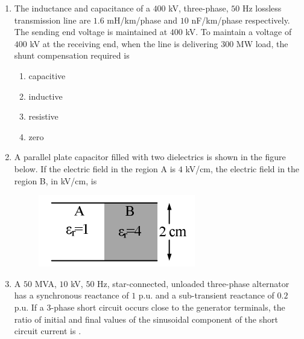 \documentclass[journal,12pt,onecolumn]{IEEEtran}
\theoremstyle{remark}
\begin{document}
\begin{enumerate}[start=1, label=Q.\arabic*]
    \hfill{}

    \item The inductance and capacitance of a $400$ kV, three-phase, $50$ Hz lossless transmission line are $1.6$ mH/km/phase and $10$ nF/km/phase respectively. The sending end voltage is maintained at $400$ kV. To maintain a voltage of $400$ kV at the receiving end, when the line is delivering $300$ MW load, the shunt compensation required is
    \begin{enumerate}
        \item capacitive
        \item inductive
        \item resistive
        \item zero
    \end{enumerate}

    \hfill{}

    \item A parallel plate capacitor filled with two dielectrics is shown in the figure below. If the electric field in the region A is $4$ kV/cm, the electric field in the region B, in kV/cm, is
    \begin{figure}[H]
        \includegraphics[width=0.4\columnwidth]{Figures/2q16.png}
        \centering
        \caption{}
    \end{figure}
    \begin{enumerate}
    \end{enumerate}

    \hfill{}

    \item A $50$ MVA, $10$ kV, $50$ Hz, star-connected, unloaded three-phase alternator has a synchronous reactance of $1$ p.u. and a sub-transient reactance of $0.2$ p.u. If a 3-phase short circuit occurs close to the generator terminals, the ratio of initial and final values of the sinusoidal component of the short circuit current is \underline{\hspace{2cm}}.


\end{enumerate}
\end{document}
